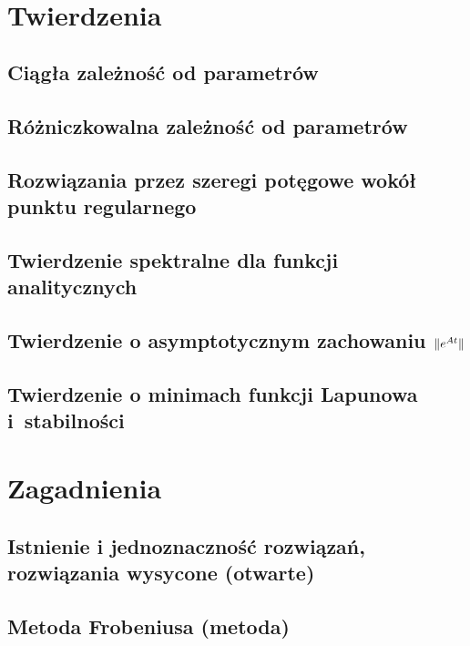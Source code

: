 



  \maketitle
  \newpage~
  \thispagestyle{empty}
  \tableofcontents
  
  \chapter{Twierdzenia}
    \section{Ciągła zależność od parametrów}
      
    \section{Różniczkowalna zależność od parametrów}
      
    \section{Rozwiązania przez szeregi potęgowe wokół punktu regularnego}
      
    \section{Twierdzenie spektralne dla funkcji analitycznych}
      
    \section{Twierdzenie o asymptotycznym zachowaniu $ \lVert e^{At}\rVert $}
      
    \section{Twierdzenie o minimach funkcji Lapunowa i~stabilności}
    
  \chapter{Zagadnienia}
    \section{Istnienie i jednoznaczność rozwiązań, rozwiązania wysycone (otwarte)}
      
    \section{Metoda Frobeniusa (metoda)}
      
